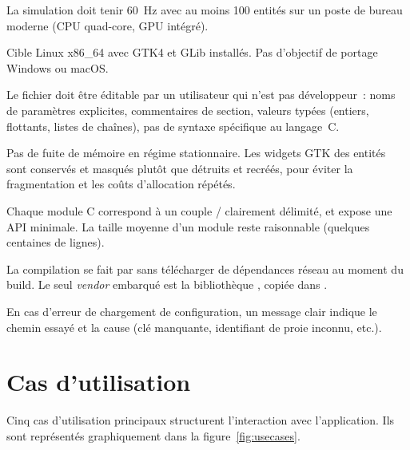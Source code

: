 \begin{description}[leftmargin=3em, style=nextline]
  \item[ENF1 -- Performance.] La simulation doit tenir 60~Hz avec
    au moins 100 entités sur un poste de bureau moderne (CPU
    quad-core, GPU intégré).

  \item[ENF2 -- Portabilité.] Cible Linux x86\_64 avec GTK4 et
    GLib installés. Pas d'objectif de portage Windows ou macOS.

  \item[ENF3 -- Lisibilité de la configuration.] Le fichier
     doit être éditable par un utilisateur
    qui n'est pas développeur~: noms de paramètres explicites,
    commentaires de section, valeurs typées (entiers, flottants,
    listes de chaînes), pas de syntaxe spécifique au langage~C.

  \item[ENF4 -- Robustesse mémoire.] Pas de fuite de mémoire en
    régime stationnaire. Les widgets GTK des entités
     sont conservés et masqués plutôt que détruits
    et recréés, pour éviter la fragmentation et les coûts
    d'allocation répétés.

  \item[ENF5 -- Modularité.] Chaque module C correspond à un
    couple / clairement délimité, et expose
    une API minimale. La taille moyenne d'un module reste
    raisonnable (quelques centaines de lignes).

  \item[ENF6 -- Reproductibilité du build.] La compilation se
    fait par  sans télécharger de dépendances
    réseau au moment du build. Le seul \emph{vendor} embarqué
    est la bibliothèque , copiée dans
    .

  \item[ENF7 -- Diagnostic.] En cas d'erreur de chargement de
    configuration, un message clair indique le chemin essayé et
    la cause (clé manquante, identifiant de proie inconnu, etc.).
\end{description}

\section{Cas d'utilisation}

Cinq cas d'utilisation principaux structurent l'interaction avec
l'application. Ils sont représentés graphiquement dans la
figure~\ref{fig:usecases}.

